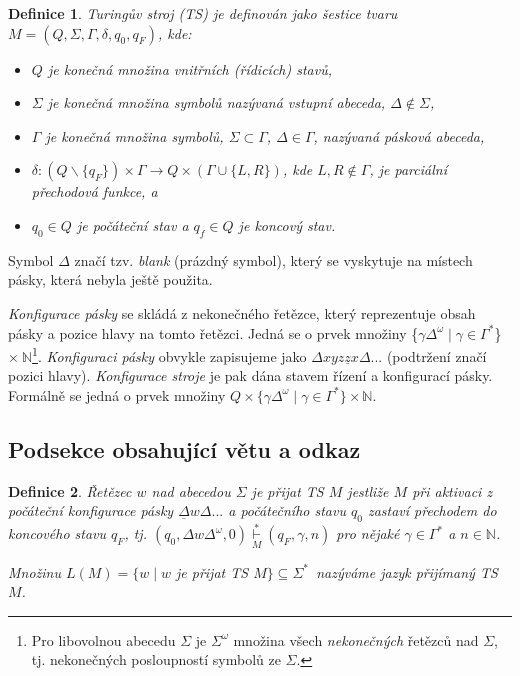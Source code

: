 \documentclass[twocolumn, a4paper, 11pt]{article}
\begin{document}
\newtheorem{definice}{Definice}
    \begin{definice}
    \label{definice1}
    \textnormal{Turingův stroj} (TS) je definován jako šestice tvaru 
    $M = (Q,\Sigma,\Gamma,\delta,q_0,q_F)$, kde:

    \begin{itemize}
        \itemsep 0.05em
        \item $Q$ je konečná množina \textnormal{vnitřních (řídicích) stavů,}
        \item $\Sigma$ je konečná množina symbolů nazývaná \textnormal{vstupní
        abeceda, $\Delta \notin  \Sigma$,}
        \item $\Gamma$ je konečná množina symbolů, $\Sigma \subset \Gamma$, $\Delta \in \Gamma$, 
        nazývaná \textnormal{pásková abeceda},
        \item $\delta : (Q \backslash \{q_F\})\times\Gamma\rightarrow Q\times(\Gamma\cup\{L, R\})$, kde $L, R \notin \Gamma$,
        je parciální \textnormal{přechodová funkce,} a
        \item $q_0 \in Q$ je \textnormal{počáteční stav} a $q_f \in Q$ je \textnormal{koncový stav.}
        \end{itemize}
\end{definice}

Symbol $\Delta$ značí tzv. \emph{blank} (prázdný symbol), který se vyskytuje na místech pásky, která nebyla ještě použita.

\emph{Konfigurace pásky} se skládá z nekonečného řetězce, který reprezentuje obsah pásky a pozice hlavy na tomto řetězci. Jedná se o prvek množiny \mbox{\{$\gamma\Delta^\omega \mid \gamma \in \Gamma^\ast$\} $\times \  \mathbb{N}$}\footnote{Pro libovolnou abecedu $\Sigma$ je $\Sigma^\omega$ množina všech \emph{nekonečných} řetězců nad $\Sigma$, tj. nekonečných posloupností symbolů ze $\Sigma$.}. \emph{Konfiguraci pásky} obvykle zapisujeme jako $\Delta xyz\underline{z}x\Delta$... (podtržení značí pozici hlavy). \emph{Konfigurace stroje} je pak dána stavem řízení a konfigurací pásky. Formálně se jedná o prvek množiny $Q\times\{\gamma\Delta^\omega \mid \gamma \in\Gamma^\ast\}\times\mathbb{N}$.

\subsection {Podsekce obsahující větu a odkaz}
\begin{definice}
    \label{definice2}
    \textnormal{Řetězec $w$ nad abecedou $\Sigma$ je přijat TS} $M$
    jestliže $M$ při aktivaci z počáteční konfigurace pásky $\underline{\Delta} w\Delta...$ 
    a počátečního stavu $q_0$ zastaví přechodem do koncového stavu 
    $q_F$, tj. $(q_0, \Delta w\Delta^\omega, 0) \underset{M}{\overset{*}{\vdash}} (q_F , \gamma, n)$ pro
    nějaké $\gamma \in \Gamma^\ast$ a $n \in \mathbb{N}$.
    
    Množinu $L(M) = \{w \mid w$ je přijat TS $M\} \subseteq \Sigma^\ast$~nazý\-váme \textnormal{jazyk přijímaný TS} $M$.  
\end{definice}
\end{document}
